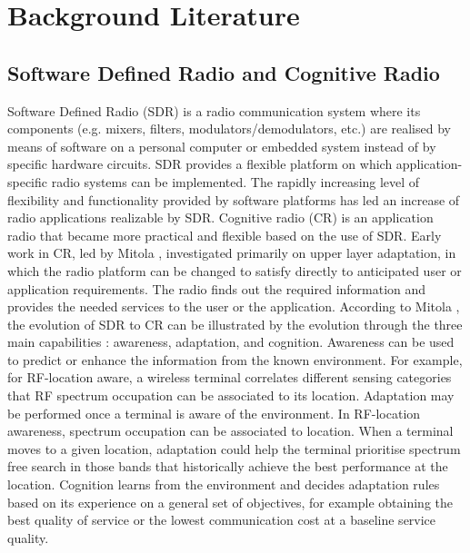 \chapter{Background Literature}
\label{chap:BackgroundLiterature}

\section{Software Defined Radio and Cognitive Radio}
Software Defined Radio (SDR) is a radio communication system where its components (e.g. mixers, filters, modulators/demodulators, etc.) are realised by means of software on a personal computer or embedded system instead of by specific hardware circuits.
SDR provides a flexible platform on which application-specific radio systems can be implemented. The rapidly increasing level of flexibility and functionality provided by software platforms has led an increase of radio applications realizable by SDR. 
Cognitive radio (CR) is an application radio that became more practical and flexible based on the use of SDR.
Early work in CR, led by Mitola \cite{Mitola1999}, investigated primarily on upper layer adaptation, in which the radio platform can be changed to satisfy directly to anticipated user or application requirements. The radio finds out the required information and provides the needed services to the user or the application.
According to Mitola \cite{Mitola2006}, the evolution of SDR to CR can be illustrated by the evolution through the three main capabilities \cite{Recio2010a}: awareness, adaptation, and cognition. 
Awareness can be used to predict or enhance the information from the known environment. For example, for RF-location aware, a wireless terminal correlates different sensing categories that RF spectrum occupation can be associated to its location.
Adaptation may be performed once a terminal is aware of the environment. In RF-location awareness, spectrum occupation can be associated to location. When a terminal moves to a given location, adaptation could help the terminal prioritise spectrum free search in those bands that historically achieve the best performance at the location.
Cognition learns from the environment and decides adaptation rules based on its experience on a general set of objectives, for example obtaining the best quality of service or the lowest communication cost at a baseline service quality.

